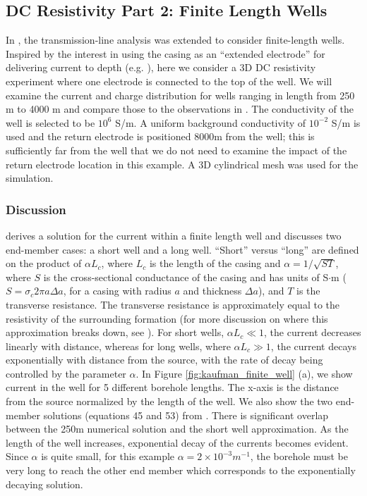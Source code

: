 \subsection{DC Resistivity Part 2: Finite Length Wells}
\label{sec:dc_resistivity_part2}

In \citep{Kaufman1993}, the transmission-line analysis was extended to consider finite-length wells. Inspired by the interest in using the casing as an ``extended electrode'' for delivering current to depth (e.g. \cite{Schenkel1994, Um2015, Weiss2016, hoversten2017borehole}), here we consider a 3D DC resistivity experiment where one electrode is connected to the top of the well. We will examine the current and charge distribution for wells ranging in length from 250 m to 4000 m and compare those to the observations in \citep{Kaufman1993}. The conductivity of the well is selected to be $10^6$ S/m. A uniform background conductivity of $10^{-2}$ S/m is used and the return electrode is positioned 8000m from the well; this is sufficiently far from the well that we do not need to examine the impact of the return electrode location in this example. A 3D cylindrical mesh was used for the simulation.

\subsubsection{Discussion}

\citep{Kaufman1993} derives a solution for the current within a finite length well and discusses two end-member cases: a short well and a long well. ``Short'' versus ``long'' are defined on the product of $\alpha L_c$, where $L_c$ is the length of the casing and $\alpha = 1/\sqrt{S T}$, where $S$ is the cross-sectional conductance of the casing and has units of S$\cdot$m ($S = \sigma_c 2\pi a \Delta a$, for a casing with radius $a$ and thickness $\Delta a$), and $T$ is the transverse resistance. The transverse resistance  is approximately equal to the resistivity of the surrounding formation (for more discussion on where this approximation breaks down, see \cite{Schenkel1994}). For short wells, $\alpha L_c \ll 1$, the current decreases linearly with distance, whereas for long wells, where $\alpha L_c \gg 1$, the current decays exponentially with distance from the source, with the rate of decay being controlled by the parameter $\alpha$. In Figure \ref{fig:kaufman_finite_well} (a), we show current in the well for 5 different borehole lengths. The x-axis is the distance from the source normalized by the length of the well. We also show the two end-member solutions (equations 45 and 53) from \cite{Kaufman1993}. There is significant overlap between the 250m numerical solution and the short well approximation. As the length of the well increases, exponential decay of the currents becomes evident. Since $\alpha$ is quite small, for this example $\alpha = 2 \times 10^{-3} m^{-1}$, the borehole must be very long to reach the other end member which corresponds to the exponentially decaying solution.

